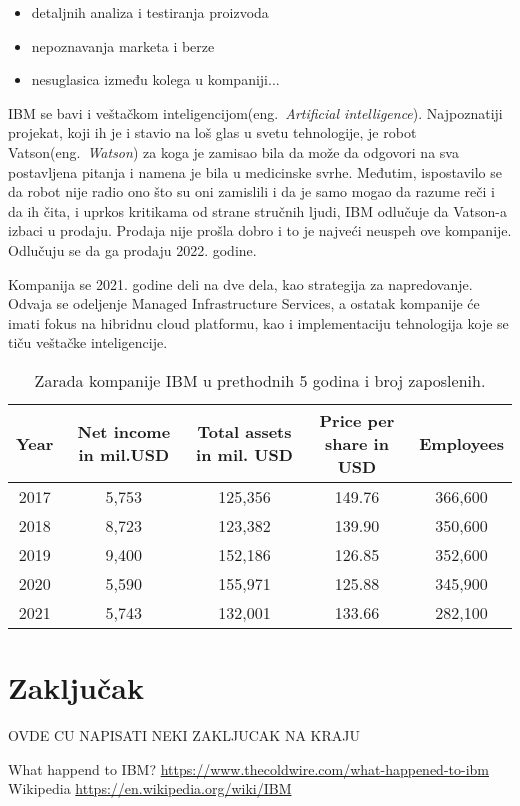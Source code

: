 \documentclass[a4paper]{article}
\begin{document}
\begin{itemize}
\item detaljnih analiza i testiranja proizvoda
\item nepoznavanja marketa i berze
\item nesuglasica između kolega u kompaniji...
\end{itemize}

IBM se bavi i veštačkom inteligencijom(eng.~{\em Artificial intelligence}). Najpoznatiji projekat, koji ih je i stavio na loš glas u svetu tehnologije, je robot Vatson(eng.~{\em Watson}) za koga je zamisao bila da može da odgovori na sva postavljena pitanja i namena je bila u medicinske svrhe. Međutim, ispostavilo se da robot nije radio ono što su oni zamislili i da je samo mogao da razume reči i da ih čita, i uprkos kritikama od strane stručnih ljudi, IBM odlučuje da Vatson-a izbaci u prodaju. Prodaja nije prošla dobro i to je najveći neuspeh ove kompanije. Odlučuju se da ga prodaju 2022. godine.

Kompanija se 2021. godine deli na dve dela, kao strategija za napredovanje. Odvaja se odeljenje Managed Infrastructure Services, a ostatak kompanije će imati fokus na hibridnu cloud platformu, kao i implementaciju tehnologija koje se tiču veštačke inteligencije.


\begin{table}[h!]
\begin{center}
\caption{Zarada kompanije IBM u prethodnih 5 godina i broj zaposlenih. \cite{tabela}}
\begin{tabular}{|c|c|c|c|c|} \hline
Year& Net income in mil.USD& Total assets in mil. USD& Price per share in USD& Employees \\ \hline
2017	&5,753	&125,356	&149.76	&366,600\\ \hline
2018	&8,723	&123,382	&139.90	&350,600\\ \hline
2019	&9,400	&152,186	&126.85	&352,600\\ \hline
2020	&5,590	&155,971	&125.88	&345,900\\ \hline
2021	&5,743	&132,001	&133.66	&282,100\\ \hline
\end{tabular}
\label{tab:tabela1}
\end{center}
\end{table}

\section{Zaključak}
OVDE CU NAPISATI NEKI ZAKLJUCAK NA KRAJU %

\renewcommand{\refname}{Literatura}
\begin{thebibliography}{9}

 What happend to IBM? 
\url{https://www.thecoldwire.com/what-happened-to-ibm}
 Wikipedia %
\url{https://en.wikipedia.org/wiki/IBM}
\end{thebibliography}
\end{document}

